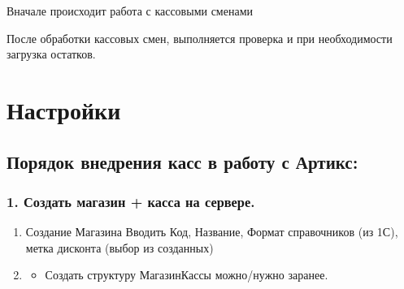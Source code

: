 \documentclass[a4paper,10pt,russian]{report}
\begin{document}
\sphinxAtStartPar
Вначале происходит работа с кассовыми сменами

\sphinxAtStartPar
{}

\sphinxAtStartPar
После обработки кассовых смен, выполняется проверка и при необходимости загрузка остатков.

\sphinxAtStartPar
{}

\sphinxstepscope


\chapter{Настройки}
\label{\detokenize{setting:id1}}\label{\detokenize{setting::doc}}
\sphinxstepscope


\section{Порядок внедрения касс в работу с Артикс:}
\label{\detokenize{kass:id1}}\label{\detokenize{kass::doc}}

\subsection{1. Создать магазин + касса на сервере.}
\label{\detokenize{kass:id2}}\begin{enumerate}
%
\item {} 
\sphinxAtStartPar
Создание Магазина \sphinxhyphen{} Вводить Код, Название, Формат справочников (из 1С), метка дисконта (выбор из созданных)

\item {} \begin{description}
\begin{itemize}
\item {} 
\sphinxAtStartPar
Создать структуру Магазин\sphinxhyphen{}Кассы можно/нужно заранее.

\end{itemize}

\end{description}

\end{enumerate}
\end{document}
